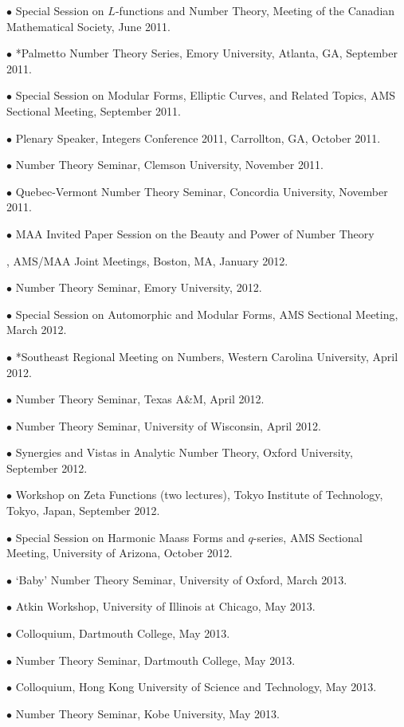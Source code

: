 \documentclass{article}
\newcommand{\categorywidth}{1in}        %
\newcommand{\categorysep}{5pt}
\newcommand{\catlistlabel}[1]%
{\raisebox{0pt}[1ex][0pt]{\makebox[\labelwidth][l]%
    {\parbox[t]{\labelwidth}{\hspace{0pt}\textbf{#1}}}}}
\newenvironment{categories}{\begin{list}{}{
      \setlength{\labelwidth}{\categorywidth}
      \setlength{\leftmargin}{\labelwidth}
      \addtolength{\leftmargin}{\labelsep}
      \setlength{\topsep}{20pt}
      \setlength{\itemsep}{\categorysep}
      \renewcommand{\makelabel}{\catlistlabel}
      }}{\end{list}}
\begin{document}
\begin{flushleft}
\begin{categories}
{$\bullet$ 
Special Session on $L$-functions and Number Theory, Meeting of the Canadian Mathematical
Society, June 2011.

$\bullet$ 
*Palmetto Number Theory Series, Emory University, Atlanta, GA, September 2011.

$\bullet$ 
Special Session on Modular Forms, Elliptic Curves, and Related Topics,
AMS Sectional Meeting, September 2011.

$\bullet$ Plenary Speaker, Integers Conference 2011, Carrollton, GA, October 2011.

$\bullet$ 
Number Theory Seminar, Clemson University, November 2011.

$\bullet$ 
Quebec-Vermont Number Theory Seminar, Concordia University, November 2011.

$\bullet$ MAA Invited Paper Session on the Beauty and
Power of Number Theory}, AMS/MAA Joint Meetings, Boston, MA, January 2012.

$\bullet$ Number Theory Seminar,
Emory University, 2012.

$\bullet$ 
Special Session on Automorphic and Modular Forms, AMS Sectional Meeting, March 2012.

$\bullet$ 
*Southeast Regional Meeting on Numbers, Western Carolina University, April 2012.

$\bullet$
Number Theory Seminar, Texas A\&M, April 2012.

$\bullet$ 
Number Theory Seminar, University of Wisconsin, April 2012.

$\bullet$ 
Synergies and Vistas in Analytic Number Theory, Oxford University, September 2012.

$\bullet$
Workshop on Zeta Functions (two lectures), Tokyo Institute of Technology, Tokyo, Japan, September 2012.

$\bullet$ 
Special Session on Harmonic Maass Forms and $q$-series, AMS Sectional Meeting, University of Arizona, October 2012.

$\bullet$
`Baby' Number Theory Seminar, University of Oxford, March 2013.

$\bullet$ 
Atkin Workshop, University of Illinois at Chicago, May 2013.

$\bullet$ Colloquium, Dartmouth College, May 2013.

$\bullet$ Number Theory Seminar,
Dartmouth College, May 2013.

$\bullet$ Colloquium,
Hong Kong University of Science and Technology, May 2013.

$\bullet$ Number Theory Seminar,
Kobe University, May 2013.


\end{categories}
\end{flushleft}
\end{document}
